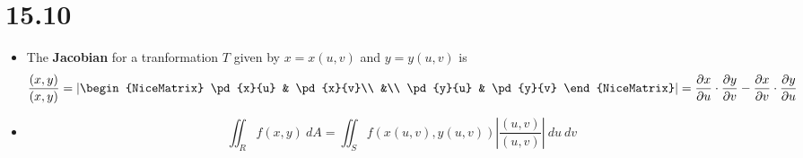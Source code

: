 \documentclass[12pt]{exam}
\newcommand{\qdate}{15.10} %
\begin{document}
\section*{\qdate}


\begin{info}
    \begin{itemize}
            \item The \textbf{Jacobian} for a tranformation \(T\) given by \(x=x(u,v)\) and \(y=y(u,v)\) is
            \[
                \dfrac{(x,y)}{(x,y)}=
                \left|\begin{NiceMatrix}
                    \pd{x}{u} & \pd{x}{v}\\
                        &\\
                    \pd{y}{u} & \pd{y}{v}
                \end{NiceMatrix}\right| = \pd{x}{u}\cdot\pd{y}{v}-\pd{x}{v}\cdot\pd{y}{u}
            \]
            \item 
            \[
                \iint_{R}f(x,y)~dA=\iint_{S}f(x(u,v),y(u,v))\left|\dfrac{(u,v)}{(u,v)}\right|~du~dv
            \]
    \end{itemize}
\end{info}
\end{document}
